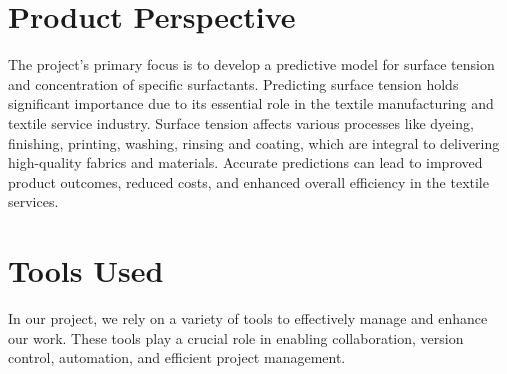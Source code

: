 \documentclass{report}
\begin{document}
\section{Product Perspective}
The project's primary focus is to develop a predictive model for surface tension and concentration of specific surfactants. Predicting surface tension holds significant importance due to its essential role in the textile manufacturing and textile service industry. Surface tension affects various processes like dyeing, finishing, printing, washing, rinsing and coating, which are integral to delivering high-quality fabrics and materials. Accurate predictions can lead to improved product outcomes, reduced costs, and enhanced overall efficiency in the textile services.

\section{Tools Used}

In our project, we rely on a variety of tools to effectively manage and enhance our work. These tools play a crucial role in enabling collaboration, version control, automation, and efficient project management.
\end{document}

